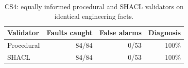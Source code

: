 \begin{table}[t]
\centering\footnotesize
\setlength{\tabcolsep}{3pt}
\caption{CS4: equally informed procedural and SHACL validators on identical engineering facts.}
\label{tab:cs4}
\begin{tabular}{@{}lrrr@{}}
\toprule
Validator & Faults caught & False alarms & Diagnosis \\
\midrule
Procedural & 84/84 & 0/53 & 100\% \\
SHACL & 84/84 & 0/53 & 100\% \\
\bottomrule
\end{tabular}
\end{table}
